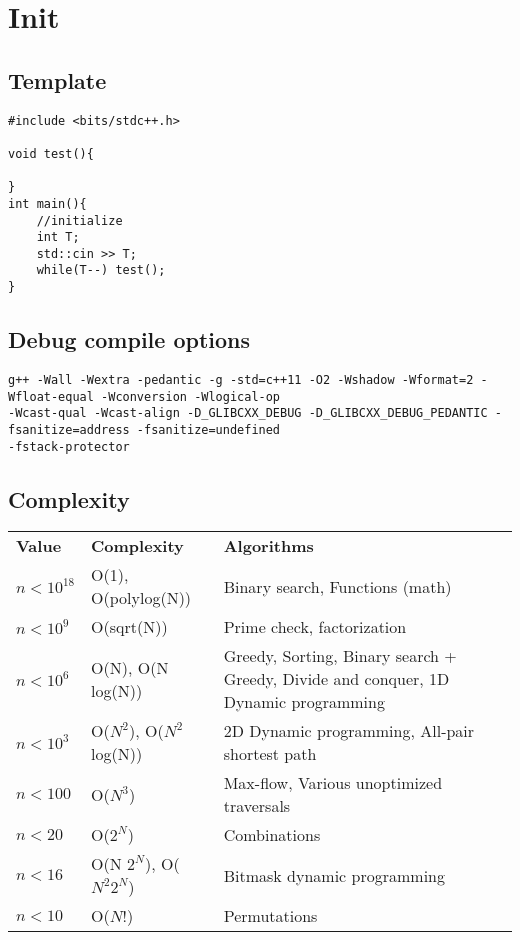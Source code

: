 \section{Init}
\subsection{Template}
\begin{verbatim}
#include <bits/stdc++.h>

void test(){

}
int main(){
	//initialize
	int T;
	std::cin >> T;
	while(T--) test();
}
\end{verbatim}

\subsection{Debug compile options}
\begin{verbatim}
g++ -Wall -Wextra -pedantic -g -std=c++11 -O2 -Wshadow -Wformat=2 -Wfloat-equal -Wconversion -Wlogical-op 
-Wcast-qual -Wcast-align -D_GLIBCXX_DEBUG -D_GLIBCXX_DEBUG_PEDANTIC -fsanitize=address -fsanitize=undefined 
-fstack-protector
\end{verbatim}

\subsection{Complexity}
\begin{tabular}[pos]{p{3cm}p{5cm}p{8cm}}
\textbf{Value} & \textbf{Complexity} & \textbf{Algorithms}\\
$n<10^{18}$ & O(1), O(polylog(N)) & Binary search, Functions (math)\\
$n<10^9$ & O(sqrt(N)) & Prime check, factorization\\
$n<10^6$ & O(N), O(N log(N)) & Greedy, Sorting, Binary search + Greedy, Divide and conquer, 1D Dynamic programming\\
$n<10^3$ & O($N^2$), O($N^2$ log(N)) & 2D Dynamic programming, All-pair shortest path\\
$n<100$ & O($N^3$) & Max-flow, Various unoptimized traversals\\
$n<20$ & O($2^N$) & Combinations\\
$n<16$ & O(N $2^N$), O($N^2 2^N$) & Bitmask dynamic programming\\
$n<10$ & O($N!$) & Permutations\\
\end{tabular}

